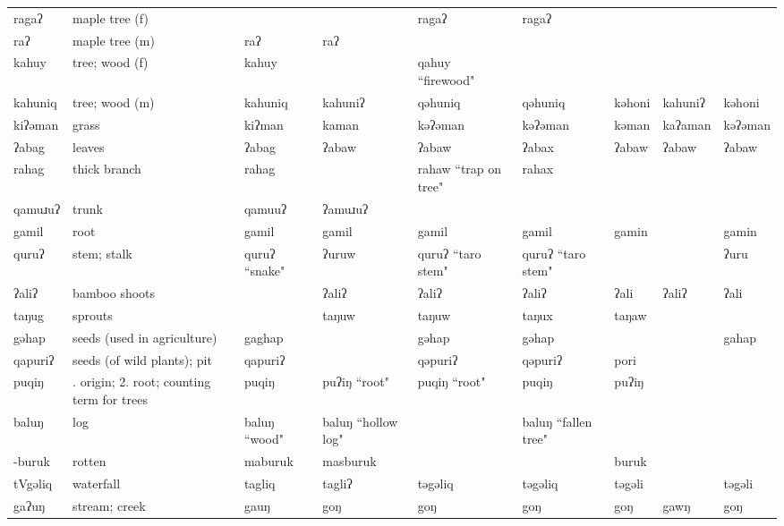 \begin{landscape}
\begin{longtable}{*{9}{>{\raggedright\arraybackslash}p{}}}
\text{*}ragaʔ & maple tree (f) &  &  & ragaʔ & ragaʔ &  &  & \\
\text{*}raʔ & maple tree (m) & raʔ & raʔ &  &  &  &  & \\
\text{*}kahuy & tree; wood (f) & kahuy &  & qahuy \newline ``firewood" &  &  &  & \\
\text{*}kahuniq & tree; wood (m) & kahuniq & kahuniʔ & qəhuniq & qəhuniq & kəhoni & kahuniʔ & kəhoni\\
\text{*}kiʔəman & grass & kiʔman & kaman & kəʔəman & kəʔəman & kəman & kaʔaman & kəʔəman\\
\text{*}ʔabag & leaves & ʔabag & ʔabaw & ʔabaw & ʔabax & ʔabaw & ʔabaw & ʔabaw\\
\text{*}rahag & thick branch & rahag &  & rahaw \newline ``trap on tree" & rahax &  &  & \\
\text{*}qamuɹuʔ & trunk & qamuuʔ & ʔamuɹuʔ &  &  &  &  & \\
\text{*}gamil & root & gamil & gamil & gamil & gamil & gamin &  & gamin\\
\text{*}quruʔ & stem; stalk & quruʔ ``snake" & ʔuruw & quruʔ \newline ``taro stem" & quruʔ \newline ``taro stem" &  &  & ʔuru\\
\text{*}ʔaliʔ & bamboo shoots &  & ʔaliʔ & ʔaliʔ & ʔaliʔ & ʔali & ʔaliʔ & ʔali\\
\text{*}taŋug & sprouts &  & taŋuw & taŋuw & taŋux & taŋaw &  & \\
\text{*}gəhap & seeds (used in agriculture) & gaghap &  & gəhap & gəhap &  &  & gahap\\
\text{*}qapuriʔ & seeds (of wild plants); pit & qapuriʔ &  & qəpuriʔ & qəpuriʔ & pori &  & \\
\text{*}puqiŋ & 1. origin; 2. root; counting term for trees & puqiŋ & puʔiŋ ``root" & puqiŋ ``root" & puqiŋ & puʔiŋ &  & \\
\text{*}baluŋ & log & baluŋ ``wood" & baluŋ \newline ``hollow log" &  & baluŋ \newline ``fallen tree" &  &  & \\
\text{*}-buruk & rotten & maburuk & masburuk &  &  & buruk &  & \\
\text{*}tVgəliq & waterfall & tagliq & tagliʔ & təgəliq & təgəliq & təgəli &  & təgəli\\
\text{*}gaʔuŋ & stream; creek & gauŋ & goŋ & goŋ & goŋ & goŋ & gawŋ & goŋ\\

\end{longtable}
\end{landscape}
